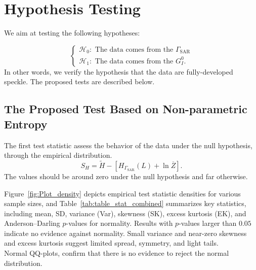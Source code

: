 \documentclass[remotesensing,article,submit,moreauthors,pdftex]{Definitions/mdpi}
\begin{document}
\hypertarget{sec:test}{%
\section{Hypothesis Testing}\label{sec:test}}

We aim at testing the following hypotheses:

\[
 \begin{cases}\mathcal{H}_0: \text{ The data comes from the } \Gamma_{\text{SAR}}\\ 
  \mathcal{H}_1:\text{ The data comes from the } G_I^0.\end{cases}
\] In other words, we verify the hypothesis that the data are
fully-developed speckle. The proposed tests are described below.

\hypertarget{the-proposed-test-based-on-non-parametric-entropy}{%
\subsection{The Proposed Test Based on Non-parametric
Entropy}\label{the-proposed-test-based-on-non-parametric-entropy}}

The first test statistic assess the behavior of the data under the null
hypothesis, through the empirical distribution. \begin{equation}
\label{Eq:test_e}
S_H= \widetilde{H}-\left[H_{\Gamma_{\text{SAR}}}(L)+\ln \overline{Z}\right].
\end{equation} The values should be around zero under the null
hypothesis and far otherwise.

Figure~\ref{fig:Plot_density} depicts empirical test statistic densities
for various sample sizes, and Table~\ref{tab:table_stat_combined}
summarizes key statistics, including mean, SD, variance (Var), skewness
(SK), excess kurtosis (EK), and Anderson--Darling \(p\)-values for
normality. Results with \(p\)-values larger than \(0.05\) indicate no
evidence against normality. Small variance and near-zero skewness and
excess kurtosis suggest limited spread, symmetry, and light tails.\\
Normal QQ-plots, confirm that there is no evidence to reject the normal
distribution.
\end{document}

